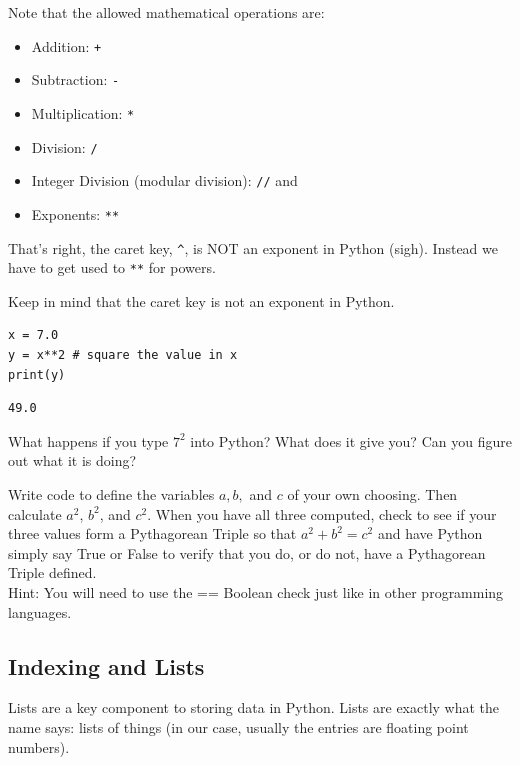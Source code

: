 Note that the allowed mathematical operations are: 
\begin{itemize}
    \item Addition: \verb|+|
    \item Subtraction: \verb|-|
    \item Multiplication: \verb|*| 
    \item Division: \verb|/| 
    \item Integer Division (modular division): \verb|//| and
    \item Exponents: \verb|**|
\end{itemize}
That's right, the caret key, \verb|^|, is NOT an exponent in Python (sigh). Instead we
have to get used to \verb|**| for powers.

\begin{example}
    Keep in mind that the caret key is not an exponent in Python.  

\bcode    
\begin{lstlisting}
x = 7.0
y = x**2 # square the value in x
print(y)
\end{lstlisting}
\boutput
\begin{lstlisting}
49.0
\end{lstlisting}
\end{example}

\begin{problem}
    What happens if you type $7^2$ into Python?  What does it give you?  Can you figure
    out what it is doing?
\end{problem}

\begin{problem}
    Write code to define the variables  $a,b,$ and $c$  of your own choosing. Then
    calculate $a^2$, $b^2$, and $c^2$. When you have all three computed, check to see if
    your three values form a Pythagorean Triple so that $a^2 + b^2 = c^2$ and have Python
    simply say True or False to verify that you do, or do not, have a Pythagorean Triple
    defined.  \\
    Hint: You will need to use the == Boolean check just like in other
    programming languages.
\end{problem}



\subsection{Indexing and Lists}
Lists are a key component to storing data in Python.  Lists are exactly what the name
says: lists of things (in our case, usually the entries are floating point numbers).  

